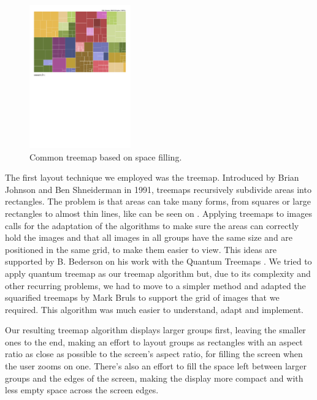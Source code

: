 \begin{figure}
	\vspace{-23pt}
	\begin{center}
		\includegraphics[width=0.39\textwidth]{Figures/Protovis-treemap.pdf}
	\end{center}
	\vspace{-20pt}
	\caption{Common treemap based on space filling.}
	\vspace{-5pt}
	\label{fig:commontreemap}
\end{figure}

The first layout technique we employed was the treemap. Introduced by Brian Johnson and Ben Shneiderman \cite{Johnson:1991:TSA:949607.949654} in 1991, treemaps recursively subdivide areas into rectangles. The problem is that areas can take many forms, from squares or large rectangles to almost thin lines, like can be seen on . Applying treemaps to images calls for the adaptation of the algorithms to make sure the areas can correctly hold the images and that all images in all groups have the same size and are positioned in the same grid, to make them easier to view. This ideas are supported by B. Bederson on his work with the Quantum Treemaps \cite{Bederson:2001:PZI:502348.502359}. We tried to apply quantum treemap as our treemap algorithm but, due to its complexity and other recurring problems, we had to move to a simpler method and adapted the squarified treemaps \cite{Bruls:2000p3517} by Mark Bruls to support the grid of images that we required. This algorithm was much easier to understand, adapt and implement.

Our resulting treemap algorithm displays larger groups first, leaving the smaller ones to the end, making an effort to layout groups as rectangles with an aspect ratio as close as possible to the screen's aspect ratio, for filling the screen when the user zooms on one. There's also an effort to fill the space left between larger groups and the edges of the screen, making the display more compact and with less empty space across the screen edges.


